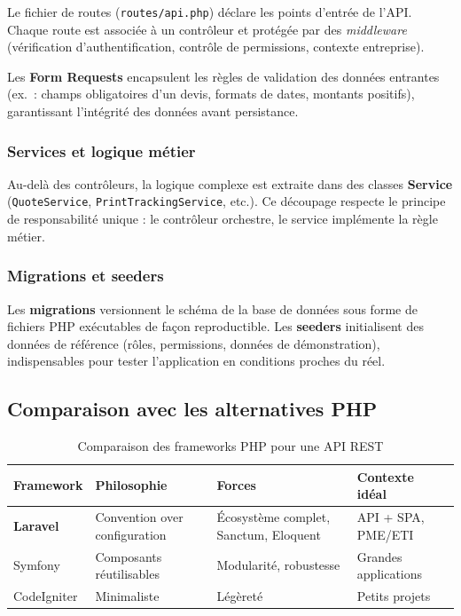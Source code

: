 Le fichier de routes (\texttt{routes/api.php}) déclare les points d'entrée de l'API.
Chaque route est associée à un contrôleur et protégée par des \textit{middleware}
(vérification d'authentification, contrôle de permissions, contexte entreprise).

Les \textbf{Form Requests} encapsulent les règles de validation des données entrantes
(ex.~: champs obligatoires d'un devis, formats de dates, montants positifs), garantissant
l'intégrité des données avant persistance.

\subsubsection{Services et logique métier}

Au-delà des contrôleurs, la logique complexe est extraite dans des classes
\textbf{Service} (\texttt{QuoteService}, \texttt{PrintTrackingService}, etc.). Ce
découpage respecte le principe de responsabilité unique : le contrôleur orchestre,
le service implémente la règle métier.

\subsubsection{Migrations et seeders}

Les \textbf{migrations} versionnent le schéma de la base de données sous forme de fichiers
PHP exécutables de façon reproductible. Les \textbf{seeders} initialisent des données
de référence (rôles, permissions, données de démonstration), indispensables pour
tester l'application en conditions proches du réel.

\subsection{Comparaison avec les alternatives PHP}

\begin{table}[H]
\caption{Comparaison des frameworks PHP pour une API REST}
\label{tab:php_frameworks}
\centering
\small
\begin{tabular}{|l|p{4cm}|p{4cm}|p{4cm}|}
\hline
\textbf{Framework} & \textbf{Philosophie} & \textbf{Forces} & \textbf{Contexte idéal} \\
\hline
\textbf{Laravel} & Convention over configuration & Écosystème complet, Sanctum, Eloquent &
API + SPA, PME/ETI \\
\hline
Symfony & Composants réutilisables & Modularité, robustesse & Grandes applications \\
\hline
CodeIgniter & Minimaliste & Légèreté & Petits projets \\
\hline
\end{tabular}
\end{table}

